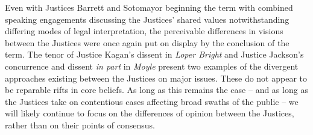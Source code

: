 Even with Justices Barrett and Sotomayor beginning the term with combined speaking engagements discussing the Justices’ shared values notwithstanding differing modes of legal interpretation, the perceivable differences in visions between the Justices were once again put on display by the conclusion of the term.  The tenor of Justice Kagan’s dissent in \emph{Loper Bright} and Justice Jackson’s concurrence and dissent \emph{in part} in \emph{Moyle} present two examples of the divergent approaches existing between the Justices on major issues. These do not appear to be reparable rifts in core beliefs. As long as this remains the case -- and as long as the Justices take on contentious cases affecting broad swaths of the public -- we will likely continue to focus on the differences of opinion between the Justices, rather than on their points of consensus.
